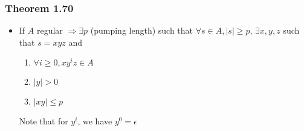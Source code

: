 \begin{frame}[allowframebreaks]
\begin{itemize}
\end{itemize}\end{frame} \begin{frame}[allowframebreaks] \frametitle{Theorem 1.70}
  \begin{itemize}
\item If $A$ regular $\Rightarrow
\exists p$ (pumping length) such that
$\forall s \in A, |s| \geq p$, 
$\exists x,y,z$ such that $s = xyz$ and
\begin{enumerate}
\item $\forall i \geq 0, xy^i z \in A$
\item $|y| > 0$
\item $|xy| \leq p$
\end{enumerate}
Note that for $y^i$, we have  $y^0=\epsilon$
\end{itemize}\end{frame}

